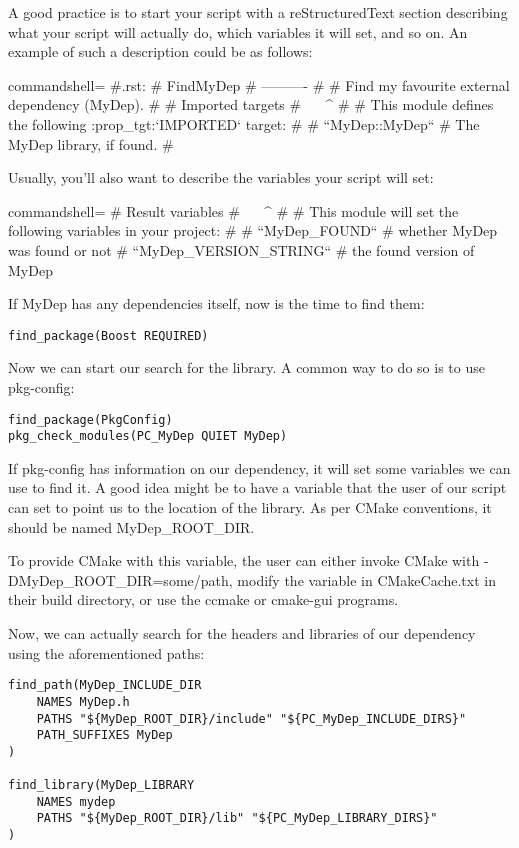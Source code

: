 A good practice is to start your script with a reStructuredText section describing what your script will actually do, which variables it will set, and so on. An example of such a description could be as follows:

\begin{tcblisting}{commandshell={}}
 #.rst:
# FindMyDep
# ----------
#
# Find my favourite external dependency (MyDep).
#
# Imported targets
# ^^^^^^^^^^^^^^^^
#
# This module defines the following :prop_tgt:`IMPORTED` target:
#
# ``MyDep::MyDep``
# The MyDep library, if found.
#
\end{tcblisting}

Usually, you'll also want to describe the variables your script will set:

\begin{tcblisting}{commandshell={}}
# Result variables
# ^^^^^^^^^^^^^^^^
#
# This module will set the following variables in your project:
#
# ``MyDep_FOUND``
# whether MyDep was found or not
# ``MyDep_VERSION_STRING``
# the found version of MyDep
\end{tcblisting}

If MyDep has any dependencies itself, now is the time to find them:

\begin{lstlisting}[style=styleCMake]
find_package(Boost REQUIRED)
\end{lstlisting}

Now we can start our search for the library. A common way to do so is to use pkg-config:

\begin{lstlisting}[style=styleCMake]
find_package(PkgConfig)
pkg_check_modules(PC_MyDep QUIET MyDep)
\end{lstlisting}

If pkg-config has information on our dependency, it will set some variables we can use to find it. A good idea might be to have a variable that the user of our script can set to point us to the location of the library. As per CMake conventions, it should be named MyDep\_ROOT\_DIR.

To provide CMake with this variable, the user can either invoke CMake with -DMyDep\_ROOT\_DIR=some/path, modify the variable in CMakeCache.txt in their build directory, or use the ccmake or cmake-gui programs.

Now, we can actually search for the headers and libraries of our dependency using the aforementioned paths:

\begin{lstlisting}[style=styleCMake]
find_path(MyDep_INCLUDE_DIR
	NAMES MyDep.h
	PATHS "${MyDep_ROOT_DIR}/include" "${PC_MyDep_INCLUDE_DIRS}"
	PATH_SUFFIXES MyDep
)

find_library(MyDep_LIBRARY
	NAMES mydep
	PATHS "${MyDep_ROOT_DIR}/lib" "${PC_MyDep_LIBRARY_DIRS}"
)
\end{lstlisting}

